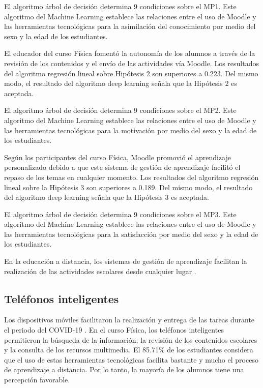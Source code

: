\documentclass[spanish]{textolivre}
\begin{document}
El algoritmo árbol de decisión determina 9 condiciones sobre el MP1. Este algoritmo del Machine Learning establece las relaciones entre el uso de Moodle y las herramientas tecnológicas para la asimilación del conocimiento por medio del sexo y la edad de los estudiantes.

El educador del curso Física fomentó la autonomía de los alumnos a través de la revisión de los contenidos y el envío de las actividades vía Moodle. Los resultados del algoritmo regresión lineal sobre Hipótesis 2 son superiores a 0.223. Del mismo modo, el resultado del algoritmo deep learning señala que la Hipótesis 2 es aceptada.

El algoritmo árbol de decisión determina 9 condiciones sobre el MP2. Este algoritmo del Machine Learning establece las relaciones entre el uso de Moodle y las herramientas tecnológicas para la motivación por medio del sexo y la edad de los estudiantes.

Según los participantes del curso Física, Moodle promovió el aprendizaje personalizado debido a que este sistema de gestión de aprendizaje facilitó el repaso de los temas en cualquier momento. Los resultados del algoritmo regresión lineal sobre la Hipótesis 3 son superiores a 0.189. Del mismo modo, el resultado del algoritmo deep learning señala que la Hipótesis 3 es aceptada.

El algoritmo árbol de decisión determina 9 condiciones sobre el MP3.  Este algoritmo del Machine Learning establece las relaciones entre el uso de Moodle y las herramientas tecnológicas para la satisfacción por medio del sexo y la edad de los estudiantes.

En la educación a distancia, los sistemas de gestión de aprendizaje facilitan la realización de las actividades escolares desde cualquier lugar \cite{farsi_investigating_2022, galarce-miranda_analysis_2022}.

\subsection{Teléfonos inteligentes}

Los dispositivos móviles facilitaron la realización y entrega de las tareas durante el periodo del COVID-19 \cite{kaminske_cell_2022, perera_university_2021}. En el curso Física, los teléfonos inteligentes permitieron la búsqueda de la información, la revisión de los contenidos escolares y la consulta de los recursos multimedia. El 85.71\% de los estudiantes considera que el uso de estas herramientas tecnológicas facilita bastante y mucho el proceso de aprendizaje a distancia. Por lo tanto, la mayoría de los alumnos tiene una percepción favorable.
\end{document}
